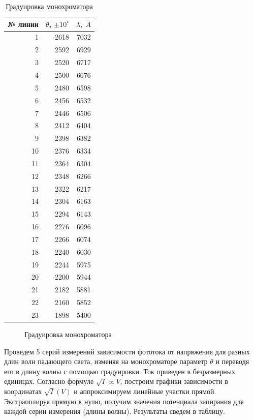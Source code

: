 \documentclass[12pt]{kiarticle} %
\begin{document}
    \begin{table}[h!]
    \begin{center}
        \caption{Градуировка монохроматора}
        \begin{tabular}{|r|r|r|}
        \hline 
        №  линии & $ \theta $, $\pm 10 ^\circ$ & $ \lambda, \;\mathring{A} $   \\ 
        \hline
        1 & 2618 & 7032 \\
        2 & 2592 & 6929 \\
        3 & 2520 & 6717 \\
        4 & 2500 & 6676 \\
        5 & 2480 & 6598 \\
        6 & 2456 & 6532 \\
        7 & 2446 & 6506 \\
        8 & 2412 & 6404 \\
        9 & 2398 & 6382 \\
        10 & 2376 & 6334 \\
        11 & 2364 & 6304 \\
        12 & 2348 & 6266 \\
        13 & 2322 & 6217 \\
        14 & 2304 & 6163 \\
        15 & 2294 & 6143 \\
        16 & 2276 & 6096 \\
        17 & 2266 & 6074 \\
        18 & 2240 & 6030 \\
        19 & 2244 & 5975 \\
        20 & 2200 & 5944 \\
        21 & 2182 & 5881 \\
        22 & 2160 & 5852 \\
        23 & 1898 & 5400 \\
        \hline
        \end{tabular}
    \end{center}
    \end{table}

    \begin{figure}[h!]
        \centering
        
        \caption{Градуировка монохроматора}
        \label{grad}
    \end{figure}
    
    Проведем 5 серий измерений зависимости фототока от напряжения для разных длин волн падающего света, 
    изменяя на монохроматоре параметр $ \theta $ и переводя его в длину волны с помощью градуировки. 
    Ток приведен в безразмерных единицах. 
    Согласно формуле $\sqrt I \propto V$, построим графики зависимости в координатах $ \sqrt{I} (V) $ и 
    аппроксимируем линейные участки прямой. Экстраполируя прямую к нулю, получим значения потенциала запирания для каждой серии измерения (длины волны). 
    Результаты сведем в таблицу. 
\end{document}
